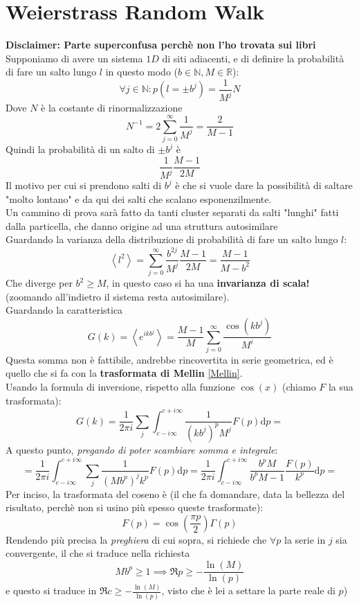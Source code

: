 \documentclass[a4paper,12pt]{article}
\theoremstyle{plain}
\theoremstyle{definition}
\newcommand{\f}[2]{\frac{#1}{#2}}
\newcommand{\ave}[1]{\left\langle#1\right\rangle }
\renewcommand{\d}{\text{d}}
\theoremstyle{remark}
\begin{document}
\section{Weierstrass Random Walk}
\textbf{Disclaimer: Parte superconfusa perchè non l'ho trovata sui libri}\\
Supponiamo di avere un sistema $1D$ di siti adiacenti, e di definire la probabilità di fare un salto lungo $l$ in questo modo ($b\in \mathbb{N}, M\in \mathbb{R}$):
\[\forall j\in\mathbb{N}:p(l=\pm b^j)=\f{1}{M^j} N\]
Dove $N$ è la costante di rinormalizzazione
\[N^{-1}=2\sum_{j=0}^\infty	\f{1}{M^j}=\f{2}{M-1}		\]
Quindi la probabilità di un salto di $\pm b^j$ è
\[\f{1}{M^j} \f{M-1}{2M}\]
Il motivo per cui si prendono salti di $b^j$ è che si vuole dare la possibilità di saltare "molto lontano" e da qui dei salti che scalano esponenzilmente. 
\\Un cammino di prova sarà fatto da tanti cluster separati da salti "lunghi" fatti dalla particella, che danno origine ad una struttura autosimilare
\\Guardando la varianza della distribuzione di probabilità di fare un salto lungo $l$:
	\[\ave{l^2}=\sum_{j=0}^{\infty}\f{b^{2j}}{M^j} \f{M-1}{2M}=	\f{M-1}{M-b^2}		\]
Che diverge per $b^2\ge M$, in questo caso si ha una \textbf{invarianza di scala!} (zoomando all'indietro il sistema resta autosimilare).	\\Guardando la caratteristica
		\[G(k)=\ave{e^{ikb^j}}=\f{M-1}{M}\sum_{j=0}^{\infty}\f{\cos(kb^j)}{M^i}\]
	Questa somma non è fattibile, andrebbe rincovertita in serie  geometrica, ed è quello che si fa con la \textbf{trasformata di Mellin} \ref{Mellin}.\\Usando la formula di inversione, rispetto alla funzione $\cos(x)$ (chiamo $F$ la sua trasformata):
	\[G(k)=\f{1}{2\pi i}\sum_j \int_{c-i\infty}^{c+i\infty}		\f{1}{\left(k b^j\right)^pM^j}F(p) \d p	=\]
	A questo punto, \emph{pregando di poter scambiare somma e integrale}:
	\[=\f{1}{2\pi i} \int_{c-i\infty}^{c+i\infty}	\sum_j	\f{1}{\left(Mb^p\right)^jk^p} F(p)\d p	=\f{1}{2\pi i} \int_{c-i\infty}^{c+i\infty}	\f{b^pM}{b^pM-1}\f{F(p)}{k^p} \d p	=\]
	Per inciso, la trasformata del coseno è (il che fa domandare, data la bellezza del risultato, perchè non si usino più spesso queste trasformate):
	\[F(p)=\cos\left(\f{\pi p}{2}\right){\Gamma(p)}{} 		\]
Rendendo più precisa la \emph{preghiera} di cui sopra, si richiede che $\forall p$ la serie in 	$j$ sia convergente, il che si traduce nella richiesta
\[Mb^p\ge1\implies \Re p\ge-\f{\ln(M)}{\ln (p)}\] 	
	e questo si traduce in $\Re c \ge -\f{\ln(M)}{\ln (p)}$, visto che è lei a settare la parte reale di $p$)
\end{document}
